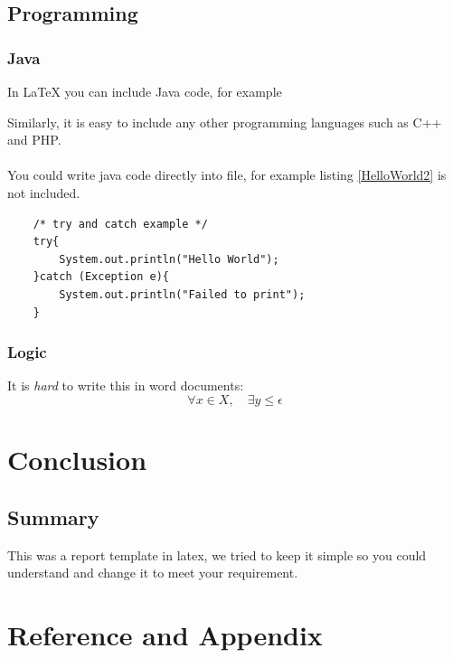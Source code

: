 \documentclass[11pt,a4paper]{report}
\begin{document}
\newpage
\section{Programming}
\subsection{Java}
In \LaTeX{} you can include Java code, for example 
\lstset{numbers=left, stepnumber=2, caption= HelloWorld.Java, label=HelloWorld}

Similarly, it is easy to include any other programming languages such as C++ and PHP.
\\ \\
You could write java code directly into file, for example listing \ref{HelloWorld2} is not included.  
\lstset{numbers=left, stepnumber=2, caption= HelloWorld2, label=HelloWorld2}
\begin{lstlisting}
	/* try and catch example */
	try{
		System.out.println("Hello World");
	}catch (Exception e){
		System.out.println("Failed to print");
	}
\end{lstlisting}

\subsection{Logic}
It is \emph{hard} to write this in word documents: 
\[
 \forall x \in X, \quad \exists y \leq \epsilon
\]


\chapter{Conclusion}
\section{Summary}
This was a report template in latex, we tried to keep it simple so you could understand and change it to meet your requirement.

\chapter{Reference and Appendix}
\newpage

\nocite{*}

\newpage
{}
\end{document}
